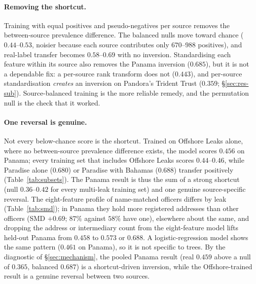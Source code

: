 \documentclass[11pt]{article}
\begin{document}
\paragraph{Removing the shortcut.} Training with equal positives and
pseudo-negatives per source removes the between-source prevalence difference.
The balanced nulls move toward chance ($0.44$--$0.53$, noisier because each source
contributes only $670$--$988$ positives), and real-label transfer becomes
$0.58$--$0.69$ with no inversion. Standardising each feature within its source
also removes the Panama inversion ($0.685$), but it is not a dependable fix: a
per-source rank transform does not ($0.443$), and per-source standardisation
\emph{creates} an inversion on Pandora's Trident Trust ($0.359$;
\S\ref{sec:res-sub}). Source-balanced training is the more reliable remedy, and
the permutation null is the check that it worked.

\paragraph{One reversal is genuine.} Not every below-chance score is the
shortcut. Trained on Offshore Leaks alone, where no between-source prevalence
difference exists, the model scores $0.456$ on Panama; every training set that
includes Offshore Leaks scores $0.44$--$0.46$, while Paradise alone ($0.680$) or
Paradise with Bahamas ($0.688$) transfer positively (Table~\ref{tab:subsets}).
The Panama result is thus the sum of a strong shortcut (null $0.36$--$0.42$ for
every multi-leak training set) and one genuine source-specific reversal. The
eight-feature profile of name-matched officers differs by leak
(Table~\ref{tab:smd}); in Panama they hold more registered addresses than other
officers (SMD $+0.69$; $87\%$ against $58\%$ have one), elsewhere about the same,
and dropping the address or intermediary count from the eight-feature model
lifts held-out Panama from $0.458$ to $0.573$ or $0.688$. A logistic-regression
model shows the same pattern ($0.461$ on Panama), so it is not specific to trees. By the diagnostic of \S\ref{sec:mechanism}, the pooled Panama
result (real $0.459$ above a null of $0.365$, balanced $0.687$) is a shortcut-driven
inversion, while the Offshore-trained result is a genuine reversal between two
sources.
\end{document}

